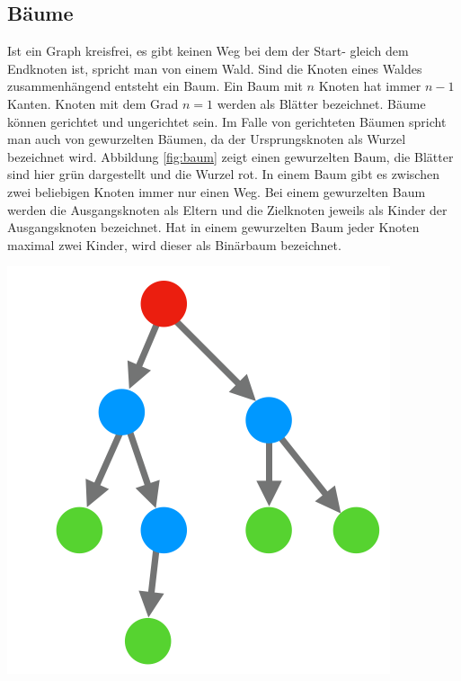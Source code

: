 \subsection{Bäume}
Ist ein Graph kreisfrei, es gibt keinen Weg bei dem der Start- gleich dem Endknoten ist, spricht man von einem Wald.
Sind die Knoten eines Waldes zusammenhängend entsteht ein Baum.
Ein Baum mit $n$ Knoten hat immer $n-1$ Kanten.\cite{basicgraphtheory}
Knoten mit dem Grad $n=1$ werden als Blätter bezeichnet.
Bäume können gerichtet und ungerichtet sein.
Im Falle von gerichteten Bäumen spricht man auch von gewurzelten Bäumen, da der Ursprungsknoten als Wurzel bezeichnet wird.
Abbildung \ref{fig:baum} zeigt einen gewurzelten Baum, die Blätter sind hier grün dargestellt und die Wurzel rot.
In einem Baum gibt es zwischen zwei beliebigen Knoten immer nur einen Weg.
Bei einem gewurzelten Baum werden die Ausgangsknoten als Eltern und die Zielknoten jeweils als Kinder der Ausgangsknoten bezeichnet.
Hat in einem gewurzelten Baum jeder Knoten maximal zwei Kinder, wird dieser als Binärbaum bezeichnet.\cite{basicgraphtheory}
\begin{center}
	\includegraphics[scale = 0.3]{./images/baum.png}
	\label{fig:baum}
\end{center}
